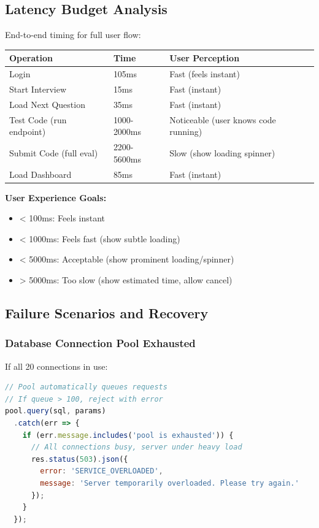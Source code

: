 \documentclass[12pt,a4paper,oneside]{article}
\begin{document}
\subsection{Latency Budget Analysis}

End-to-end timing for full user flow:

\begin{table}[H]
\centering
\begin{tabular}{|p{3cm}|p{2cm}|p{7cm}|}
\hline
\textbf{Operation} & \textbf{Time} & \textbf{User Perception} \\
\hline
Login & 105ms & Fast (feels instant) \\
\hline
Start Interview & 15ms & Fast (instant) \\
\hline
Load Next Question & 35ms & Fast (instant) \\
\hline
Test Code (run endpoint) & 1000-2000ms & Noticeable (user knows code running) \\
\hline
Submit Code (full eval) & 2200-5600ms & Slow (show loading spinner) \\
\hline
Load Dashboard & 85ms & Fast (instant) \\
\hline
\end{tabular}
\end{table}

\textbf{User Experience Goals:}

\begin{itemize}
    \item < 100ms: Feels instant
    \item < 1000ms: Feels fast (show subtle loading)
    \item < 5000ms: Acceptable (show prominent loading/spinner)
    \item > 5000ms: Too slow (show estimated time, allow cancel)
\end{itemize}

\subsection{Failure Scenarios and Recovery}

\subsubsection{Database Connection Pool Exhausted}

If all 20 connections in use:

\begin{lstlisting}[language=JavaScript, caption=Connection Pool Handling]
// Pool automatically queues requests
// If queue > 100, reject with error
pool.query(sql, params)
  .catch(err => {
    if (err.message.includes('pool is exhausted')) {
      // All connections busy, server under heavy load
      res.status(503).json({
        error: 'SERVICE_OVERLOADED',
        message: 'Server temporarily overloaded. Please try again.'
      });
    }
  });
\end{lstlisting}
\end{document}
